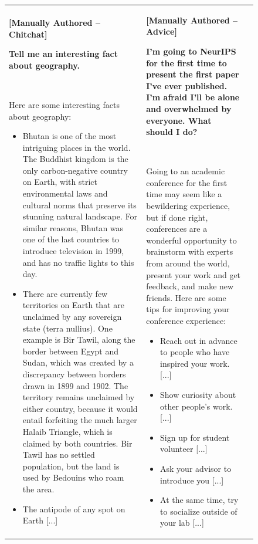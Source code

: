 \documentclass{article}
\begin{document}
\begin{figure}[p]
\begin{tabular}{@{}p{}p{}p{}@{}}
    \\
    \midrule
    \textbf{[Manually Authored -- Chitchat]}
    
    \textcolor[HTML]{3078BE}{\textbf{Tell me an interesting fact about geography.}}

    ~
    
    Here are some interesting facts about geography:
    \begin{itemize}[leftmargin=8pt]
        \item Bhutan is one of the most intriguing places in the world. The Buddhist kingdom is the only carbon-negative country on Earth, with strict environmental laws and cultural norms that preserve its stunning natural landscape. For similar reasons, Bhutan was one of the last countries to introduce television in 1999, and has no traffic lights to this day.
        \item There are currently few territories on Earth that are unclaimed by any sovereign state (terra nullius). One example is Bir Tawil, along the border between Egypt and Sudan, which was created by a discrepancy between borders drawn in 1899 and 1902. The territory remains unclaimed by either country, because it would entail forfeiting the much larger Halaib Triangle, which is claimed by both countries. Bir Tawil has no settled population, but the land is used by Bedouins who roam the area.
        \item The antipode of any spot on Earth \textcolor[HTML]{808080}{[...]}
    \end{itemize} 
    &
    \textbf{[Manually Authored -- Advice]}
    
    \textcolor[HTML]{3078BE}{\textbf{I'm going to NeurIPS for the first time to present the first paper I've ever published. I'm afraid I'll be alone and overwhelmed by everyone. What should I do?}}
    
    ~
    
    Going to an academic conference for the first time may seem like a bewildering experience, but if done right, conferences are a wonderful opportunity to brainstorm with experts from around the world, present your work and get feedback, and make new friends. Here are some tips for improving your conference experience:
    \begin{itemize}[leftmargin=8pt]
    \item Reach out in advance to people who have inspired your work. \textcolor[HTML]{808080}{[...]}
    \item Show curiosity about other people's work. \textcolor[HTML]{808080}{[...]}
    \item Sign up for student volunteer \textcolor[HTML]{808080}{[...]}
    \item Ask your advisor to introduce you \textcolor[HTML]{808080}{[...]}
    \item At the same time, try to socialize outside of your lab \textcolor[HTML]{808080}{[...]}
    \end{itemize}
    

\end{tabular}
\end{figure}
\end{document}
